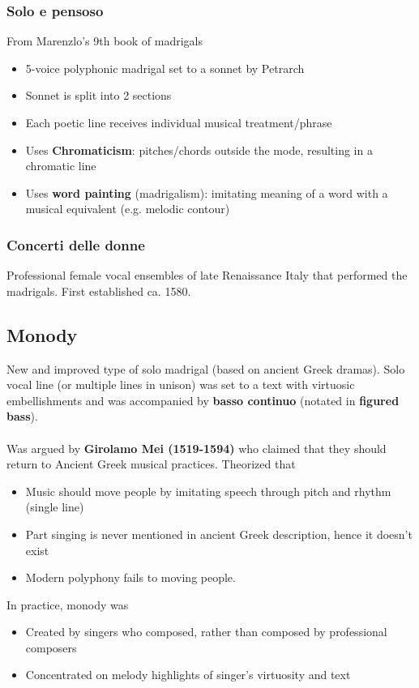 \documentclass{article}
\begin{document}
  \subsubsection{Solo e pensoso}
  From Marenzlo's 9th book of madrigals
  \begin{itemize}
    \item 5-voice polyphonic madrigal set to a sonnet by Petrarch
    \item Sonnet is split into 2 sections
    \item Each poetic line receives individual musical treatment/phrase
    \item Uses \textbf{Chromaticism}: pitches/chords outside the mode, resulting in a chromatic line
    \item Uses \textbf{word painting} (madrigalism): imitating meaning of a word with a musical equivalent (e.g. melodic contour)
  \end{itemize}
  \subsubsection{Concerti delle donne}
  Professional female vocal ensembles of late Renaissance Italy that performed the madrigals. First established ca. 1580.
  \subsection{Monody}
  New and improved type of solo madrigal (based on ancient Greek dramas). Solo vocal line (or multiple lines in unison) was set to a text with virtuosic embellishments and was accompanied by \textbf{basso continuo} (notated in \textbf{figured bass}). \\ \\
  Was argued by \textbf{Girolamo Mei (1519-1594)} who claimed that they should return to Ancient Greek musical practices. Theorized that
  \begin{itemize}
    \item Music should move people by imitating speech through pitch and rhythm (single line)
    \item Part singing is never mentioned in ancient Greek description, hence it doesn't exist
    \item Modern polyphony fails to moving people. 
  \end{itemize}
  In practice, monody was
  \begin{itemize}
    \item Created by singers who composed, rather than composed by professional composers
    \item Concentrated on melody highlights of singer's virtuosity and text
  \end{itemize}
\end{document}
